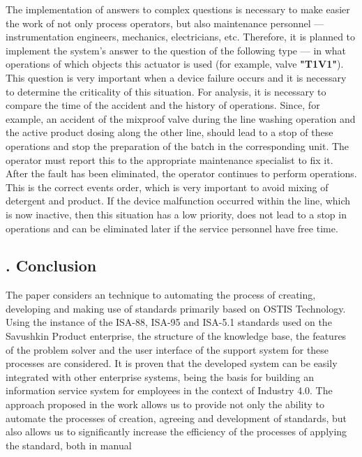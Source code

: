 \documentclass[7pt]{article} \twocolumn
\newcommand{\RomanNumeralCaps}[1]
{\MakeUppercase{\romannumeral #1}} %
\begin{document}
The implementation of answers to complex questions
is necessary to make easier the work of not only process
operators, but also maintenance personnel — instrumentation engineers, mechanics, electricians, etc. Therefore,
it is planned to implement the system’s answer to the
question of the following type — in what operations
of which objects this actuator is used (for example,
valve \textbf{"T1V1"}). This question is very important when a
device failure occurs and it is necessary to determine the
criticality of this situation. For analysis, it is necessary
to compare the time of the accident and the history of
operations. Since, for example, an accident of the mixproof valve during the line washing operation and the
active product dosing along the other line, should lead
to a stop of these operations and stop the preparation of
the batch in the corresponding unit. The operator must
report this to the appropriate maintenance specialist to
fix it. After the fault has been eliminated, the operator
continues to perform operations. This is the correct
events order, which is very important to avoid mixing of
detergent and product. If the device malfunction occurred \newpage
\noindent within the line, which is now inactive, then this situation
has a low priority, does not lead to a stop in operations
and can be eliminated later if the service personnel have
free time.
\begin{center}
    \section*{\footnotesize \RomanNumeralCaps{9}. Conclusion}
\end{center}
\par The paper considers an technique to automating the
process of creating, developing and making use of standards primarily based on OSTIS Technology. Using the
instance of the ISA-88, ISA-95 and ISA-5.1 standards
used on the Savushkin Product enterprise, the structure
of the knowledge base, the features of the problem solver
and the user interface of the support system for these
processes are considered. It is proven that the developed
system can be easily integrated with other enterprise
systems, being the basis for building an information
service system for employees in the context of Industry
4.0. The approach proposed in the work allows us to
provide not only the ability to automate the processes
of creation, agreeing and development of standards, but
also allows us to significantly increase the efficiency of
the processes of applying the standard, both in manual
\end{document}

